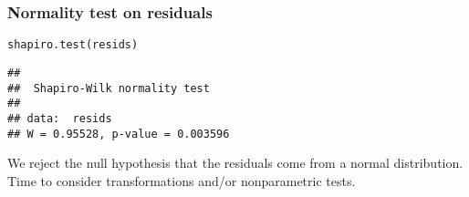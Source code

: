 \documentclass[color=usenames,dvipsnames]{beamer}\usepackage[]{graphicx}\usepackage[]{color}
\makeatletter
\newcommand{\hlstd}[1]{\textcolor[rgb]{0,0,0}{#1}}%
\newcommand{\hlkwd}[1]{\textcolor[rgb]{0.004,0.004,0.506}{#1}}%
\newenvironment{kframe}{%
 \def\at@end@of@kframe{}%
 \ifinner\ifhmode%
  \def\at@end@of@kframe{\end{minipage}}%
  \begin{minipage}{\columnwidth}%
 \fi\fi%
 \def\FrameCommand##1{\hskip\@totalleftmargin \hskip-\fboxsep
 \colorbox{shadecolor}{##1}\hskip-\fboxsep
     \hskip-\linewidth \hskip-\@totalleftmargin \hskip\columnwidth}%
 \MakeFramed {\advance\hsize-\width
   \@totalleftmargin\z@ \linewidth\hsize
   \@setminipage}}%
 {\par\unskip\endMakeFramed%
 \at@end@of@kframe}
\newenvironment{knitrout}{}{} %
\makeatother
\begin{document}
\begin{frame}[fragile]
  \frametitle{Normality test on residuals}
\begin{knitrout}
\color{fgcolor}\begin{kframe}
\begin{alltt}
\hlkwd{shapiro.test}\hlstd{(resids)}
\end{alltt}
\begin{verbatim}
## 
## 	Shapiro-Wilk normality test
## 
## data:  resids
## W = 0.95528, p-value = 0.003596
\end{verbatim}
\end{kframe}
\end{knitrout}
\vspace{0.6cm}
{We reject the null hypothesis that the residuals come from a normal
  distribution. Time to consider transformations and/or nonparametric
  tests.}
\end{frame}












\end{document}
